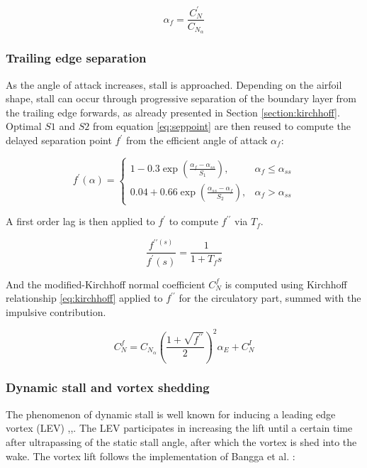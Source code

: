 \begin{equation}
\alpha_f = \frac{C_N^{\prime}}{C_{N_\alpha}}
\label{eq:equivalent_alpha}
\end{equation}

\subsubsection{Trailing edge separation}

As the angle of attack increases, stall is approached. Depending on the airfoil shape, stall can occur through progressive separation of the boundary layer from the trailing edge forwards, as already presented in Section \ref{section:kirchhoff}. Optimal $S1$ and $S2$ from equation \eqref{eq:seppoint} are then reused to compute the delayed separation point $f^{\prime}$ from the efficient angle of attack $\alpha_f$:

\begin{equation}
f^{\prime}(\alpha)=\left\{\begin{array}{ll}
1-0.3 \exp \left(\frac{\alpha_{f}-\alpha_{ss}}{S_{1}}\right), & \alpha_{f} \leq \alpha_{ss} \\
0.04+0.66 \exp \left(\frac{\alpha_{ss}-\alpha_{f}}{S_{2}}\right), & \alpha_{f}>\alpha_{ss}
\end{array}\right.
\end{equation}

A first order lag is then applied to $f^{\prime}$ to compute $f^{\prime \prime}$ via $T_f$. 

\begin{equation}
\frac{f^{\prime \prime (s)}}{f^{\prime} (s)} = \frac{1}{1 + T_f s}
\end{equation}

And the modified-Kirchhoff normal coefficient $C_N^f$ is computed using Kirchhoff relationship \eqref{eq:kirchhoff} applied to $f^{\prime \prime}$ for the circulatory part, summed with the impulsive contribution.

\begin{equation}
	C_{N}^{f}=C_{N_{\alpha}}\left(\frac{1+\sqrt{f^{\prime \prime}}}{2}\right)^{2} \alpha_{E}+C_{N}^{I}\label{eq:mod_kirchoff}
\end{equation}

\subsubsection{Dynamic stall and vortex shedding}

The phenomenon of dynamic stall is well known for inducing a leading edge vortex (LEV) \cite{mccroskey_dynamic_1976},\cite{mulleners_onset_2010},\cite{mulleners_dynamic_2013}. The LEV participates in increasing the lift until a certain time after ultrapassing of the static stall angle, after which the vortex is shed into the wake. The vortex lift follows the implementation of Bangga et al. \cite{bangga_improved_2020}:

